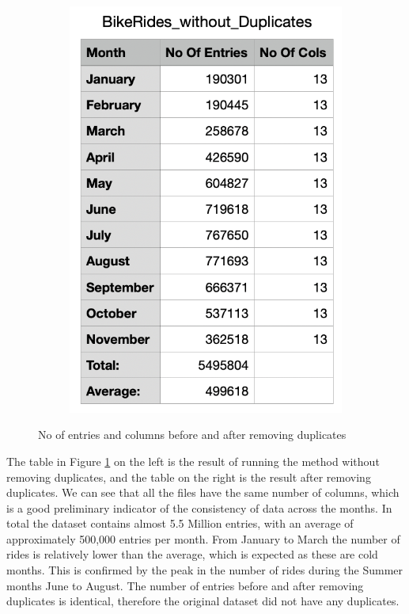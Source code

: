 \documentclass[12pt]{article}
\begin{document}
\begin{itemize}
\begin{figure}[h]
\begin{subfigure}{.4\textwidth}
		\includegraphics[scale=0.5]{img3.png}
	\end{subfigure}
	\caption{No of entries and columns before and after removing duplicates}
	\label{fig3}
	\end{figure}
	
The table in Figure \ref{fig3} on the left is the result of running the method without removing duplicates, and the table on the right is the result after removing duplicates. We can see that all the files have the same number of columns, which is a good preliminary indicator of the consistency of data across the months. In total the dataset contains almost 5.5 Million entries, with an average of approximately 500,000 entries per month. From January to March the number of rides is relatively lower than the average, which is expected as these are cold months. This is confirmed by the peak in the number of rides during the Summer months June to August. The number of entries before and after removing duplicates is identical, therefore the original dataset did not have any duplicates. \\


\end{itemize}
\end{document}
